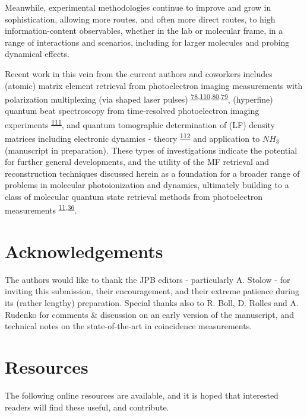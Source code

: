 \documentclass[10pt]{article}
\begin{document}
Meanwhile, experimental methodologies continue to improve and grow in sophistication, allowing more routes, and often more direct routes, to high information-content observables, whether in the lab or molecular frame, in a range of interactions and scenarios, including for larger molecules and probing dynamical effects. 


Recent work in this vein from the current authors and coworkers includes (atomic) matrix element retrieval from photoelectron imaging measurements with polarization multiplexing (via shaped laser pulses) \textsuperscript{\hyperref[csl:78]{78},\hyperref[csl:110]{110},\hyperref[csl:80]{80},\hyperref[csl:79]{79}}, (hyperfine) quantum beat spectroscopy from time-resolved photoelectron imaging experiments \textsuperscript{\hyperref[csl:111]{111}}, and quantum tomographic determination of (LF) density matrices including electronic dynamics - theory \textsuperscript{\hyperref[csl:112]{112}} and application to $NH_3$ (manuscript in preparation). These types of investigations indicate the potential for further general developments, and the utility of the MF retrieval and reconstruction techniques discussed herein as a foundation for a broader range of problems in molecular photoionization and dynamics, ultimately building to a class of molecular quantum state retrieval methods from photoelectron measurements \textsuperscript{\hyperref[csl:11]{11},\hyperref[csl:36]{36}}. 






\section{Acknowledgements}

The authors would like to thank the JPB editors - particularly A. Stolow - for inviting this submission, their encouragement, and their extreme patience during its (rather lengthy) preparation. Special thanks also to R. Boll, D. Rolles and A. Rudenko for comments \& discussion on an early version of the manuscript, and technical notes on the state-of-the-art in coincidence measurements.

\section{Resources\label{sec:resources}}

The following online resources are available, and it is hoped that interested readers will find these useful, and contribute.
\end{document}
